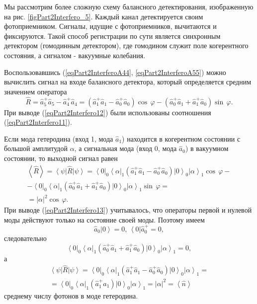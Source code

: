 

Мы рассмотрим более сложную схему балансного детектирования,
изображенную на рис. \ref{figPart2Interfero_5}. Каждый канал
детектируется своим фотоприемником. Сигналы, идущие с фотоприемников, 
вычитаются и фиксируются. Такой способ регистрации по сути является
синхронным детектором (гомодинным детектором), где гомодином служит
поле когерентного состояния, а сигналом - вакуумные колебания.

Воспользовавшись (\ref{eqPart2InterferoA44},
\ref{eqPart2InterferoA55}) можно вычислить
сигнал на входе балансного детектора, который определяется средним значением
оператора  
\begin{equation}
\hat{R} = 
\hat{a}_5^{+} \hat{a}_5 - 
\hat{a}_4^{+} \hat{a}_4 =
\left(
\hat{a}_1^{+} \hat{a}_1 - 
\hat{a}_0^{+} \hat{a}_0
\right) \cos\,\varphi -
\left(
\hat{a}_0^{+} \hat{a}_1 + 
\hat{a}_1^{+} \hat{a}_0
\right) \sin\,\varphi.
\label{eqPart2Interfero12}
\end{equation}
При выводе (\ref{eqPart2Interfero12}) были использованы соотношения
(\ref{eqPart2Interfero11}).

Если мода гетеродина (вход 1, мода $\hat{a}_1$) находится в
когерентном состоянии с большой амплитудой $\alpha$, а сигнальная мода
(вход 0, мода $\hat{a}_0$) в вакуумном состоянии, то выходной сигнал
равен
\begin{eqnarray}
\left<\hat{R}\right> = 
\left<\psi\right|\hat{R} \left|\psi\right> = 
\left<0\right|_0\left<\alpha\right|_1
\left(
\hat{a}_1^{+} \hat{a}_1 - 
\hat{a}_0^{+} \hat{a}_0
\right)
\left|0\right>_0\left|\alpha\right>_1
\cos\,\varphi
-
\nonumber \\
-
\left<0\right|_0\left<\alpha\right|_1
\left(
\hat{a}_0^{+} \hat{a}_1 + 
\hat{a}_1^{+} \hat{a}_0
\right) 
\left|0\right>_0\left|\alpha\right>_1
\sin\,\varphi = 
\nonumber \\
= \left|\alpha\right|^2 \cos\,\varphi.
\label{eqPart2Interfero13}
\end{eqnarray}
При выводе (\ref{eqPart2Interfero13}) учитывалось, что операторы
первой и нулевой моды действуют только на состояние своей
моды. Поэтому имеем
\[
\hat{a}_0\left|0\right> = 0, \, 
\left<0\right|\hat{a}_0^{+} = 0,
\]
следовательно 
\[
\left<0\right|_0\left<\alpha\right|_1
\left(
\hat{a}_0^{+} \hat{a}_1 + 
\hat{a}_1^{+} \hat{a}_0
\right) 
\left|0\right>_0\left|\alpha\right>_1 = 0,
\]
а
\begin{eqnarray}
\left<\psi\right|\hat{R} \left|\psi\right>= 
\left<0\right|_0\left<\alpha\right|_1
\left(
\hat{a}_1^{+} \hat{a}_1 - 
\hat{a}_0^{+} \hat{a}_0
\right)
\left|0\right>_0\left|\alpha\right>_1
=
\nonumber \\
=
\left<0\right|_0\left<\alpha\right|_1
\left(
\hat{a}_1^{+} \hat{a}_1
\right)
\left|0\right>_0\left|\alpha\right>_1
= \left|\alpha\right|^2 = 
\left<\hat{n}\right>
\nonumber
\end{eqnarray}
среднему числу фотонов в моде гетеродина.

